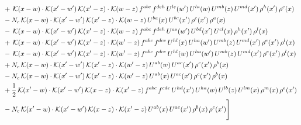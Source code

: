 \documentclass[9pt]{article}
\numberwithin{equation}{section}
\begin{document}
\begin{align}
& +\,\mathcal{K}(x-w)\cdot\mathcal{K}(x'-w')\,\mathcal{K}(x'-z)\cdot\mathcal{K}(w-z)\,f^{abc}\,f^{deh}\,U^{le}(w')\,U^{la}(w)\,U^{mb}(z)\,U^{md}(x')\,\rho^{h}(x')\,\rho^{c}(x)\notag\\
& -N_{c}\,\mathcal{K}(x-w)\cdot\mathcal{K}(x'-w')\,\mathcal{K}(x'-z)\cdot\mathcal{K}(w-z)\,U^{ba}(x)\,U^{bc}(x')\,\rho^{c}(x')\,\rho^{a}(x)\notag\\
& -\,\mathcal{K}(x-w)\cdot\mathcal{K}(x'-w')\,\mathcal{K}(x'-z)\cdot\mathcal{K}(w-z)\,f^{abc}\,f^{deh}\,U^{ae}(w')\,U^{bd}(x')\,U^{cl}(x)\,\rho^{h}(x')\,\rho^{l}(x)\notag\\
& +\,\mathcal{K}(x-w)\cdot\mathcal{K}(x'-w')\,\mathcal{K}(x'-z)\cdot\mathcal{K}(w'-z)\,f^{abc}\,f^{dce}\,U^{hl}(x)\,U^{ha}(w')\,U^{mb}(z)\,U^{md}(x')\,\rho^{e}(x')\,\rho^{l}(x)\notag\\
& -\,\mathcal{K}(x-w)\cdot\mathcal{K}(x'-w')\,\mathcal{K}(x'-z)\cdot\mathcal{K}(w'-z)\,f^{abc}\,f^{dce}\,U^{hl}(w)\,U^{ha}(w')\,U^{mb}(z)\,U^{md}(x')\,\rho^{e}(x')\,\rho^{l}(x)\notag\\
& +N_{c}\,\mathcal{K}(x-w)\cdot\mathcal{K}(x'-w')\,\mathcal{K}(x'-z)\cdot\mathcal{K}(w'-z)\,U^{ab}(w)\,U^{ac}(x')\,\rho^{c}(x')\,\rho^{b}(x)\notag\\
& -N_{c}\,\mathcal{K}(x-w)\cdot\mathcal{K}(x'-w')\,\mathcal{K}(x'-z)\cdot\mathcal{K}(w'-z)\,U^{ab}(x)\,U^{ac}(x')\,\rho^{c}(x')\,\rho^{b}(x)\notag\\
& +\frac{1}{2}\,\mathcal{K}(x'-w)\cdot\mathcal{K}(x'-w')\,\mathcal{K}(x-z)\cdot\mathcal{K}(x'-z)\,f^{abc}\,f^{cde}\,U^{hd}(x')\,U^{ha}(w)\,U^{lb}(z)\,U^{lm}(x)\,\rho^{m}(x)\,\rho^{e}(x')\notag\\
& -N_{c}\,\mathcal{K}(x'-w)\cdot\mathcal{K}(x'-w')\,\mathcal{K}(x-z)\cdot\mathcal{K}(x'-z)\,U^{ab}(x)\,U^{ac}(x')\,\rho^{b}(x)\,\rho^{c}(x')\Bigg]
\end{align}
\end{document}
